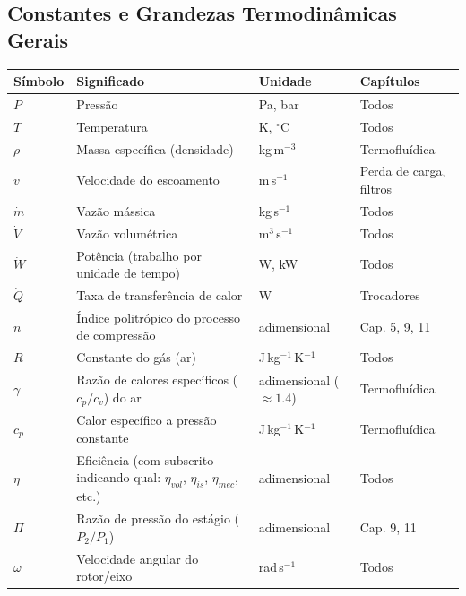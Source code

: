 \documentclass[12pt,a4paper]{article}
\numberwithin{equation}{section}
\numberwithin{table}{section}
\numberwithin{figure}{section}
\begin{document}
{\small
\setlength{\tabcolsep}{3pt}
\renewcommand{\arraystretch}{1.15}

\subsection*{Constantes e Grandezas Termodinâmicas Gerais}
\begin{longtable}{|p{2.0cm}|p{6.1cm}|p{2.1cm}|p{4.2cm}|}
	\hline
	\textbf{Símbolo} & \textbf{Significado} & \textbf{Unidade} & \textbf{Capítulos} \\ \hline
	\endhead
	$P$ & Pressão & Pa, bar & Todos \\ \hline
	$T$ & Temperatura & K, $^{\circ}$C & Todos \\ \hline
	$\rho$ & Massa específica (densidade) & kg\,m$^{-3}$ & Termofluídica \\ \hline
	$v$ & Velocidade do escoamento & m\,s$^{-1}$ & Perda de carga, filtros \\ \hline
	$\dot{m}$ & Vazão mássica & kg\,s$^{-1}$ & Todos \\ \hline
	$\dot{V}$ & Vazão volumétrica & m$^3$\,s$^{-1}$ & Todos \\ \hline
	$\dot{W}$ & Potência (trabalho por unidade de tempo) & W, kW & Todos \\ \hline
	$\dot{Q}$ & Taxa de transferência de calor & W & Trocadores \\ \hline
	$n$ & Índice politrópico do processo de compressão & adimensional & Cap. 5, 9, 11 \\ \hline
	$R$ & Constante do gás (ar) & J\,kg$^{-1}$\,K$^{-1}$ & Todos \\ \hline
	$\gamma$ & Razão de calores específicos ($c_p/c_v$) do ar & adimensional ($\approx 1.4$) & Termofluídica \\ \hline
	$c_p$ & Calor específico a pressão constante & J\,kg$^{-1}$\,K$^{-1}$ & Termofluídica \\ \hline
	$\eta$ & Eficiência (com subscrito indicando qual: $\eta_{vol}$, $\eta_{is}$, $\eta_{mec}$, etc.) & adimensional & Todos \\ \hline
	$\Pi$ & Razão de pressão do estágio ($P_2/P_1$) & adimensional & Cap. 9, 11 \\ \hline
	$\omega$ & Velocidade angular do rotor/eixo & rad\,s$^{-1}$ & Todos \\ \hline
\end{longtable}

}
\end{document}
